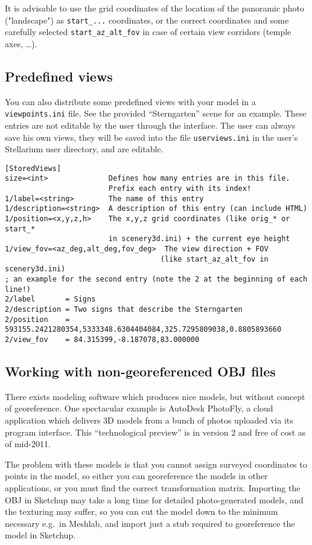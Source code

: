 \documentclass[a4paper]{article}
\newcommand{\filename}[1]{\texttt{#1}}
\begin{document}
It is advisable to use the grid coordinates of the location of the panoramic
photo ("landscape") as \verb|start_...| coordinates, or the correct coordinates
and some carefully selected \texttt{start\_az\_alt\_fov} in case of certain view
corridors (temple axes, \ldots).

\subsection{Predefined views}
You can also distribute some predefined views with your model in a
\filename{viewpoints.ini} file. See the provided ``Sterngarten'' scene for an
example. These entries are not editable by the user through the interface. The
user can always save his own views, they will be saved into the file
\filename{userviews.ini} in the user's Stellarium user directory, and are editable.

\begin{verbatim}
[StoredViews]
size=<int>              Defines how many entries are in this file. 
                        Prefix each entry with its index!
1/label=<string>        The name of this entry
1/description=<string>  A description of this entry (can include HTML)
1/position=<x,y,z,h>    The x,y,z grid coordinates (like orig_* or start_*
                        in scenery3d.ini) + the current eye height
1/view_fov=<az_deg,alt_deg,fov_deg>  The view direction + FOV
                                    (like start_az_alt_fov in scenery3d.ini)
; an example for the second entry (note the 2 at the beginning of each line!)
2/label       = Signs
2/description = Two signs that describe the Sterngarten
2/position    = 593155.2421280354,5333348.6304404084,325.7295809038,0.8805893660
2/view_fov    = 84.315399,-8.187078,83.000000
\end{verbatim}

\subsection{Working with non-georeferenced OBJ files}
\label{sec:NonGeoreferenced}


There exists modeling software which produces nice models, but without
concept of georeference. One spectacular example is AutoDesk PhotoFly,
a cloud application which delivers 3D models from a bunch of photos
uploaded via its program interface. This ``technological preview'' is
in version 2 and free of cost as of mid-2011.

The problem with these models is that you cannot assign surveyed
coordinates to points in the model, so either you can georeference the
models in other applications, or you must find the correct
transformation matrix.  Importing the OBJ in Sketchup may take a long
time for detailed photo-generated models, and the texturing may
suffer, so you can cut the model down to the minimum necessary e.g.\ in
Meshlab, and import just a stub required to georeference the model in
Sketchup. 
\end{document}
